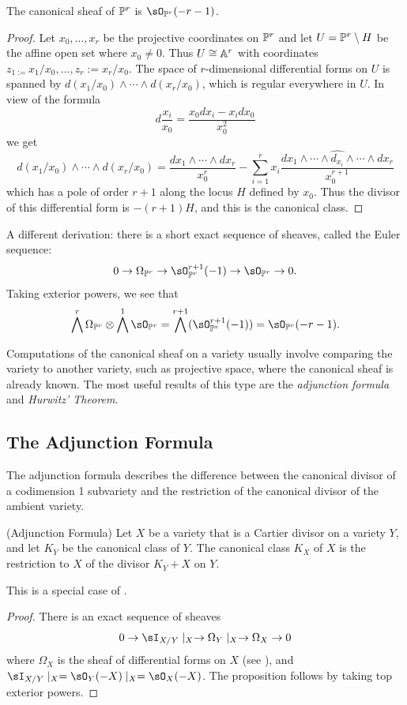 \begin{theorem}
 The canonical sheaf of $\PP^{r}$ is $\sO_{\PP^{r}}(-r-1)$. 
\end{theorem}
\begin{proof}
Let $x_{0}, \dots, x_{r}$ be the projective coordinates on $\PP^{r}$ and let  $U = \PP^{r}\setminus H$ be the affine open set where $x_{0} \neq 0$. Thus $U \cong \AA^{r}$ with coordinates $z_{1 := }x_{1}/x_{0}, \dots, z_{r}:=x_{r}/x_{0}$. The space of $r$-dimensional differential forms on $U$ is spanned by $d(x_{1}/x_{0})\wedge\cdots\wedge d(x_{r}/x_{0})$, which is regular everywhere in $U$. In view of the formula
$$
d\frac{x_{i}}{x_{0}} = \frac{x_{0}dx_{i}-x_{i}dx_{0}}{x_{0}^{2}}
$$
we get
$$
d(x_{1}/x_{0})\wedge\cdots\wedge d(x_{r}/x_{0}) = \frac{dx_{1}\wedge\cdots\wedge dx_{r}}{x_{0}^{r}}-
\sum_{i=1}^{r} x_{i} \frac{ dx_{1}\wedge\cdots \wedge \widehat{d_{x_{i}}}\wedge \cdots \wedge dx_{r}}{x_{0}^{r+1}}
$$
which has a pole of order $r+1$ along the locus $H$ defined by $x_{0}$. Thus the divisor of this differential form
is $-(r+1)H$, and this is the canonical class.
\end{proof}

\begin{fact}
A different derivation: there is a short exact sequence of sheaves, called the Euler sequence:
$$
0\to \Omega_{\PP^{r}} \to \sO_{\PP^{r}}^{r+1} (-1) \to \sO_{\PP^{r}} \to 0.
$$
Taking exterior powers, we see that
$$
\bigwedge^{r}\Omega_{\PP^{r}} \otimes \bigwedge^{1}\sO_{\PP^{r}} = \bigwedge^{r+1} (\sO_{\PP^{r}}^{r+1} (-1)) = \sO_{\PP^{r}}(-r-1).
$$
\end{fact}

Computations of the canonical sheaf on a variety usually involve comparing the variety to another variety, such as projective space, where the canonical sheaf is already known. The most useful results of this type are  the \emph{adjunction formula}
and \emph{Hurwitz' Theorem}. 

\subsection{The Adjunction Formula}\label{Adjunction Formula}

The adjunction formula describes the difference between the canonical divisor of
a codimension 1 subvariety and the restriction of the canonical divisor of the ambient variety.


\begin{proposition}\label{adjunction}(Adjunction Formula)
 Let $X$ be a variety that is a Cartier divisor on a variety $Y$, and let $K_{Y}$ be the canonical class of $Y$. The canonical class $K_X$ of $X$ is
 the restriction to $X$ of the divisor $K_{Y}+X$ on $Y$.
\end{proposition}
This is a special case of \cite[****]{H}.
\begin{proof}
 There is an exact sequence of sheaves
 $$
0\to  \sI_{X/Y}\mid_{X} \to \Omega_{Y}\mid _{X} \to \Omega_{X} \to 0
 $$
 where $\Omega_{X}$ is the sheaf of differential forms on $X$ (see \cite[Theorem ***]{Eisenbud95}), and
$ \sI_{X/Y}\mid_{X} = \sO_{Y}(-X)\mid_{X} = \sO_{X}(-X)$. The proposition follows by taking top exterior powers.
\end{proof}

